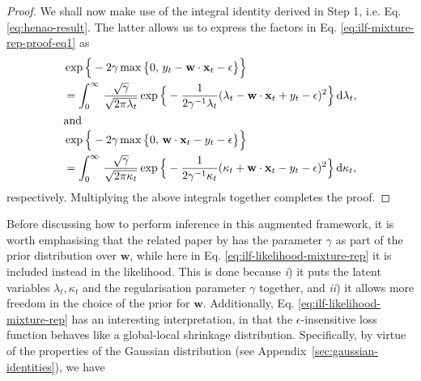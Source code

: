 \begin{proof}
We shall now make use of the integral identity derived in Step 1, i.e. Eq. \eqref{eq:henao-result}. The latter allows us to express the factors in Eq. \eqref{eq:ilf-mixture-rep-proof-eq1} as
\begin{align}
	& \exp\Big\{-2\gamma\max\big\{0,\, y_t - \mathbf{w}\cdot\mathbf{x}_t - \epsilon\big\}\Big\}
	\nonumber \\
	&= \int_{0}^{\infty}\,\frac{\sqrt{\gamma}}{\sqrt{2\pi\lambda_t}}\exp\Big\{-\frac{1}{2\gamma^{-1}\lambda_t}(\lambda_t - \mathbf{w}\cdot\mathbf{x}_t + y_t - \epsilon)^2\Big\}\,\mathrm{d}\lambda_t,
	\\
\intertext{and}
	& \exp\Big\{-2\gamma\max\big\{0,\, \mathbf{w}\cdot\mathbf{x}_t - y_t - \epsilon\big\}\Big\}
	\nonumber \\	
	&= \int_{0}^{\infty}\,\frac{\sqrt{\gamma}}{\sqrt{2\pi\kappa_t}}\exp\Big\{-\frac{1}{2\gamma^{-1}\kappa_t}(\kappa_t + \mathbf{w}\cdot\mathbf{x}_t - y_t - \epsilon)^2\Big\}\,\mathrm{d}\kappa_t,
\end{align}
respectively. Multiplying the above integrals together completes the proof.
\end{proof}
Before discussing how to perform inference in this augmented framework, it is worth emphasising that the related paper by \citet{deng16} has the parameter $\gamma$ as part of the prior distribution over $\mathbf{w}$, while here in Eq. \eqref{eq:ilf-likelihood-mixture-rep} it is included instead in the likelihood. This is done because \emph{i}) it puts the latent variables $\lambda_t, \kappa_t$ and the regularisation parameter $\gamma$ together, and \emph{ii}) it allows more freedom in the choice of the prior for $\mathbf{w}$. Additionally, Eq. \eqref{eq:ilf-likelihood-mixture-rep} has an interesting interpretation, in that the $\epsilon$-insensitive loss function behaves like a global-local shrinkage distribution. Specifically, by virtue of the properties of the Gaussian distribution (see Appendix~\ref{sec:gaussian-identities}), we have
